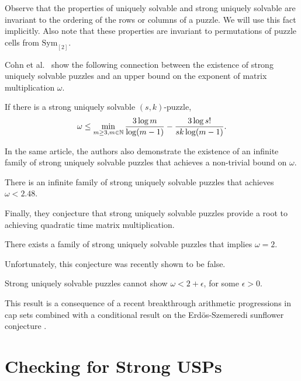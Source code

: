 \documentclass[11pt]{article}
\newcommand\Sym[1]{\ensuremath{\mathrm{Sym}_{#1}}}
\begin{document}
Observe that the properties of uniquely solvable and strong uniquely
solvable are invariant to the ordering of the rows or columns of a
puzzle.  We will use this fact implicitly.  Also note that these
properties are invariant to permutations of puzzle cells from
\Sym{[2]}.

Cohn et al.~ show the following connection between the existence of
strong uniquely solvable puzzles and an upper bound on the exponent of
matrix multiplication $\omega$.

\begin{lemma}
  If there is a strong uniquely solvable $(s,k)$-puzzle,
  $$\omega \le \min_{m \ge 3, m \in \mathbb{N}} \frac{3 \log m}{\log(m-1)} - \frac{3 \log s!}{sk \log(m-1)}.$$
\end{lemma}

In the same article, the authors also demonstrate the existence of an
infinite family of strong uniquely solvable puzzles that achieves a
non-trivial bound on $\omega$.

\begin{lemma}
  There is an infinite family of strong uniquely solvable puzzles that
  achieves $\omega < 2.48$.
\end{lemma}

Finally, they conjecture that strong uniquely solvable puzzles provide
a root to achieving quadratic time matrix multiplication.

\begin{conjecture}
There exists a family of strong uniquely solvable puzzles that implies
$\omega = 2$.
\end{conjecture}

Unfortunately, this conjecture was recently shown to be false.

\begin{lemma}
  Strong uniquely solvable puzzles cannot show $\omega < 2 +
  \epsilon$, for some $\epsilon > 0$.
\end{lemma}

This result is a consequence of a recent breakthrough arithmetic
progressions in cap sets \cite{e16,clp16} combined with a conditional
result on the Erdös-Szemeredi sunflower conjecture \cite{asu13}.



\section{Checking for Strong USPs}
\label{sec:check}
\end{document}
